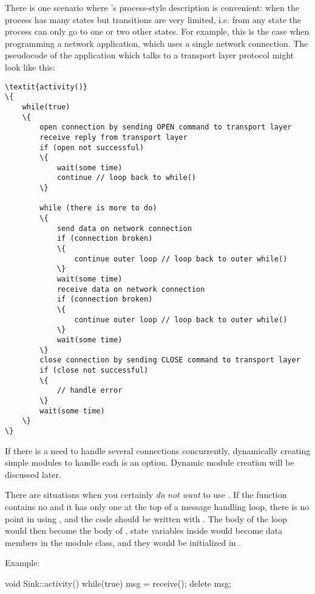 There is one scenario where 's process-style
description is convenient: when the process has many
states but transitions are very limited, i.e. from any state the
process can only go to one or two other states.  For example, this is
the case when programming a network application, which uses a single
network connection.  The pseudocode of the application which talks to
a transport layer protocol might look like this:

\begin{Verbatim}[commandchars=\\\{\}]
\textit{activity()}
\{
    while(true)
    \{
        open connection by sending OPEN command to transport layer
        receive reply from transport layer
        if (open not successful)
        \{
            wait(some time)
            continue // loop back to while()
        \}

        while (there is more to do)
        \{
            send data on network connection
            if (connection broken)
            \{
                continue outer loop // loop back to outer while()
            \}
            wait(some time)
            receive data on network connection
            if (connection broken)
            \{
                continue outer loop // loop back to outer while()
            \}
            wait(some time)
        \}
        close connection by sending CLOSE command to transport layer
        if (close not successful)
        \{
            // handle error
        \}
        wait(some time)
    \}
\}
\end{Verbatim}

If there is a need to handle several connections concurrently, dynamically creating
simple modules to handle each is an option. Dynamic module creation will be discussed
later.

There are situations when you certainly \textit{do not want} to use .
If the  function contains no  and it has only one
 at the top of a message handling loop, there is no point in
using , and the code should be written with .
The body of the loop would then become the body of ,
state variables inside  would become data members in
the module class, and they would be initialized in .

Example:

\begin{cpp}
void Sink::activity()
{
    while(true) {
        msg = receive();
        delete msg;
    }
}
\end{cpp}

